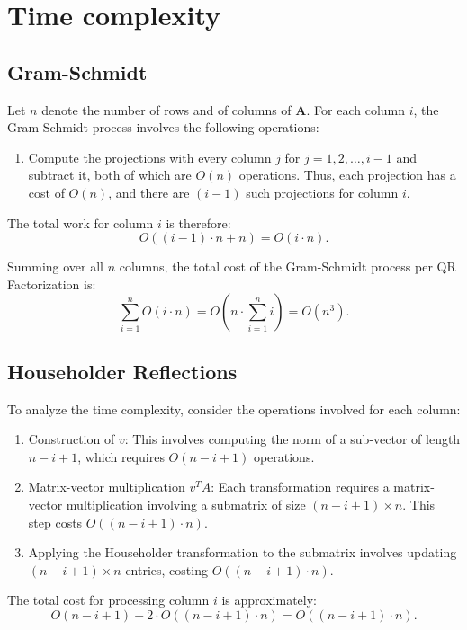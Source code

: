 \documentclass[12pt,a4paper]{article}
\let\vec\mathbf
\begin{document}
\section{Time complexity}

\subsection{Gram-Schmidt}

Let $n$ denote the number of rows and of columns of $\vec{A}$. For each column $i$, the Gram-Schmidt process involves the following operations:
\begin{enumerate}
    \item Compute the projections with every column $j$ for $j = 1, 2, \ldots, i-1$ and subtract it, both of which are $O(n)$ operations. Thus, each projection has a cost of $O(n)$, and there are $(i-1)$ such projections for column $i$.
\end{enumerate}

The total work for column $i$ is therefore:
\[
O((i-1) \cdot n + n) = O(i \cdot n).
\]

Summing over all $n$ columns, the total cost of the Gram-Schmidt process per QR Factorization is:
\[
\sum_{i=1}^{n} O(i \cdot n) = O(n \cdot \sum_{i=1}^{n} i) = O(n^3).
\]

\subsection{Householder Reflections}

To analyze the time complexity, consider the operations involved for each column:
\begin{enumerate}
    \item Construction of \( v \): This involves computing the norm of a sub-vector of length \( n-i+1 \), which requires \( O(n-i+1) \) operations.
    \item Matrix-vector multiplication \( v^T A \): Each transformation requires a matrix-vector multiplication involving a submatrix of size \( (n-i+1) \times n \). This step costs \( O((n-i+1) \cdot n) \).
    \item Applying the Householder transformation to the submatrix involves updating \( (n-i+1) \times n \) entries, costing \( O((n-i+1) \cdot n) \).
\end{enumerate}

The total cost for processing column \( i \) is approximately:
\[
O(n-i+1) + 2 \cdot O((n-i+1) \cdot n) = O((n-i+1) \cdot n).
\]
\end{document}
